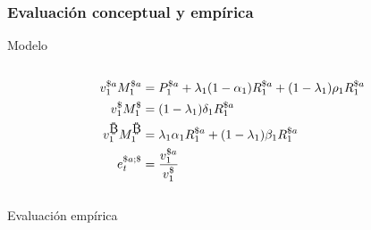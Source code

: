 \begin{frame}[t]
\frametitle{Evaluación conceptual y empírica}
    
    \begin{block}{Modelo}
        \vspace{-10pt}
        \begin{column}{0.4\textwidth}
            \tiny
            \begin{align*}
            v^{\$a}_1 M^{\$a}_1&=P_1^{{\$a}} + \lambda_1 (1-\alpha_1) R_1^{{\$a}} + (1-\lambda_1) {\rho_1}  R_1^{{\$a}}\\
            v_1^{\$} M_1^{\$}&=(1-\lambda_1){\delta_1} R_1^{\$a}\\
            v_1^{\bitcoinA} M_1^{\bitcoinA}&={\lambda_1}  \alpha_1 R_1^{\$a} + (1-\lambda_1){\beta_1} R_1^{\$a}\\
            e_t^{{\$a};{\$}}&=\frac{v_1^{\$a}}{v_1^{\$}}
            \end{align*}
        \end{column}
        \begin{column}{0.4\textwidth}
        \end{column}
    \end{block}
    
\begin{block}{Evaluación empírica}
    
    \begin{minipage}[t][.4\textheight][t]{\textwidth}
                    

\end{minipage}
\end{block}
\end{frame}
